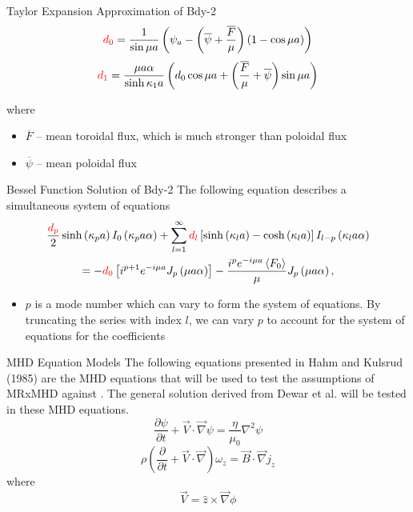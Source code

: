 \documentclass{beamer}
\newcommand{\lr}[1]{\left(#1\right)}
\newcommand{\lrsq}[1]{\left[ #1 \right]}
\newcommand{\lra}[1]{\left\langle #1 \right\rangle}
\newcommand{\besj}[2]{J_{#1}\lr{#2}}
\newcommand{\besi}[2]{I_{#1}\lr{#2}}
\begin{document}
\begin{frame}[t]
\begin{textblock}{15}
\begin{block}{Taylor Expansion Approximation of Bdy-2}
\begin{equation}
    \textcolor{red}{d_0}=\frac{1}{\sin{\mu a}} \lr{\psi_a - \lr{\overline{\psi} + \frac{\overline{F}}{\mu}}(1-\cos{\mu a})}
\end{equation} 
\begin{equation}
    \textcolor{red}{d_1}=\frac{\mu a \alpha}{\sinh{\kappa_1 a}}\lr{d_0\cos{\mu a} + \lr{\frac{\overline{F}}{\mu}    + \overline{\psi}}\sin{\mu a}}
\end{equation} 

where
\begin{itemize}
    \item $\overline{F}$ -- mean toroidal flux, which is much stronger than poloidal flux
    \item $\overline{\psi}$ -- mean poloidal flux
\end{itemize}

\end{block}
\begin{block}{Bessel Function Solution of Bdy-2}
The following equation describes a simultaneous system of equations
\begin{multline}
    \frac{\textcolor{red}{d_p}}{2}\sinh\lr{\kappa_p a}\besi{0}{\kappa_p a \alpha}+\sum_{l=1}^{\infty}\textcolor{red}{d_l}\lrsq{\sinh\lr{\kappa_l a}-\cosh\lr{\kappa_l a}}\besi{l-p}{\kappa_l a \alpha}\\
    = -\textcolor{red}{d_0}\left[i^{p+1}e^{-i\mu a}\besj{p}{\mu a \alpha}\right]-\frac{i^p e^{-i\mu a}\lra{F_0}}{\mu}\besj{p}{\mu a \alpha},\label{eq2.42}
\end{multline}
\begin{itemize}
    \item $p$ is a mode number which can vary to form the system of equations. By truncating the series with index $l$, we can vary $p$ to account for the system of equations for the coefficients
\end{itemize}
    
\end{block}

\begin{block}{MHD Equation Models}
    The following equations presented in Hahm and Kulsrud (1985) are the MHD equations that will be used to test the assumptions of MRxMHD against \cite{hahmkulsrud}. The general solution derived from Dewar et al. will be tested in these MHD equations.
\begin{equation}
    \label{eq:hk15}
    \frac{\partial \psi}{\partial t} + \vec{V}\cdot \vec{\nabla} \psi= \frac{\eta}{\mu_0} \nabla ^2 \psi
\end{equation} 
\begin{equation}
    \label{eq:hk16}
    \rho\left( \frac{\partial }{\partial t} + \vec{V}\cdot \vec{\nabla} \right)\omega_z = \vec{B}\cdot \vec{\nabla}j_z
\end{equation} 
where
\begin{equation}
    \vec{V}= \hat{z}\times \vec{\nabla}\phi
\end{equation} 


\end{block}
\end{textblock}
\end{frame}
\end{document}
